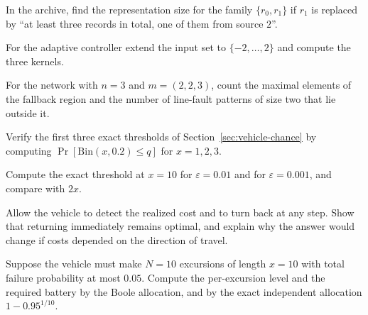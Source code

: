 \begin{exercise}
In the archive, find the representation size for the family $\{r_0,r_1\}$ if $r_1$ is replaced by ``at least three records in total, one of them from source $2$''.
\end{exercise}

\begin{exercise}
For the adaptive controller extend the input set to $\{-2,\dots,2\}$ and compute the three kernels.
\end{exercise}

\begin{exercise}
For the network with $n=3$ and $m=(2,2,3)$, count the maximal elements of the fallback region and the number of line-fault patterns of size two that lie outside it.
\end{exercise}

\begin{exercise}
Verify the first three exact thresholds of Section~\ref{sec:vehicle-chance} by computing $\Pr[\mathrm{Bin}(x,0.2)\le q]$ for $x=1,2,3$.\label{ex2:thr-three}
\end{exercise}

\begin{exercise}
Compute the exact threshold at $x=10$ for $\varepsilon=0.01$ and for $\varepsilon=0.001$, and compare with $2x$.\label{ex2:thr-ten}
\end{exercise}

\begin{exercise}
Allow the vehicle to detect the realized cost and to turn back at any step. Show that returning immediately remains optimal, and explain why the answer would change if costs depended on the direction of travel.
\end{exercise}

\begin{exercise}
Suppose the vehicle must make $N=10$ excursions of length $x=10$ with total failure probability at most $0.05$. Compute the per-excursion level and the required battery by the Boole allocation, and by the exact independent allocation $1-0.95^{1/10}$.\label{ex2:boole-ten}
\end{exercise}

